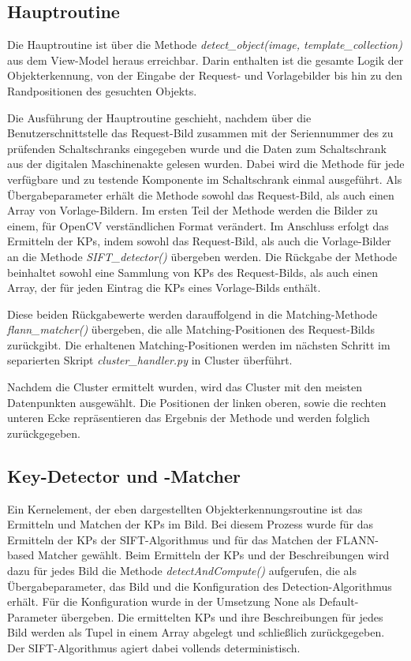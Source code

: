 \documentclass[
    type=Prakikumsbericht,
    status=draft, %
    language=german, %
    bibengine=bibtex,
]{unibwm-inf-thesis}
\begin{document}
    \subsection{Hauptroutine}
    Die Hauptroutine ist über die Methode \textit{detect\_object(image, template\_collection)} aus dem View-Model heraus erreichbar.
    Darin enthalten ist die gesamte Logik der Objekterkennung, von der Eingabe der Request- und Vorlagebilder bis hin zu den Randpositionen des gesuchten Objekts.

    Die Ausführung der Hauptroutine geschieht, nachdem über die Benutzerschnittstelle das Request-Bild zusammen mit der Seriennummer des zu prüfenden Schaltschranks eingegeben wurde und die Daten zum Schaltschrank aus der digitalen Maschinenakte gelesen wurden.
    Dabei wird die Methode für jede verfügbare und zu testende Komponente im Schaltschrank einmal ausgeführt.
    Als Übergabeparameter erhält die Methode sowohl das Request-Bild, als auch einen Array von Vorlage-Bildern.
    Im ersten Teil der Methode werden die Bilder zu einem, für OpenCV verständlichen Format verändert.
    Im Anschluss erfolgt das Ermitteln der \acp{KP}, indem sowohl das Request-Bild, als auch die Vorlage-Bilder an die Methode \textit{SIFT\_detector()} übergeben werden.
    Die Rückgabe der Methode beinhaltet sowohl eine Sammlung von \acp{KP} des Request-Bilds, als auch einen Array, der für jeden Eintrag die \acp{KP} eines Vorlage-Bilds enthält.

    Diese beiden Rückgabewerte werden darauffolgend in die Matching-Methode \textit{flann\_matcher()} übergeben, die alle Matching-Positionen des Request-Bilds zurückgibt.
    Die erhaltenen Matching-Positionen werden im nächsten Schritt im separierten Skript \textit{cluster\_handler.py} in Cluster überführt.

    Nachdem die Cluster ermittelt wurden, wird das Cluster mit den meisten Datenpunkten ausgewählt.
    Die Positionen der linken oberen, sowie die rechten unteren Ecke repräsentieren das Ergebnis der Methode und werden folglich zurückgegeben.

    \subsection{Key-Detector und -Matcher} \label{subsubsec:Key-Detector-Matcher}
    Ein Kernelement, der eben dargestellten Objekterkennungsroutine ist das Ermitteln und Matchen der \acp{KP} im Bild.
    Bei diesem Prozess wurde für das Ermitteln der \acp{KP} der \ac{SIFT}-Algorithmus und für das Matchen der \ac{FLANN}-based Matcher gewählt.
    Beim Ermitteln der \acp{KP} und der Beschreibungen wird dazu für jedes Bild die Methode \textit{detectAndCompute()} aufgerufen, die als Übergabeparameter, das Bild und die Konfiguration des Detection-Algorithmus erhält.
    Für die Konfiguration wurde in der Umsetzung None als Default-Parameter übergeben.
    Die ermittelten \acp{KP} und ihre Beschreibungen für jedes Bild werden als Tupel in einem Array abgelegt und schließlich zurückgegeben.
    Der \ac{SIFT}-Algorithmus agiert dabei vollends deterministisch.
\end{document}
